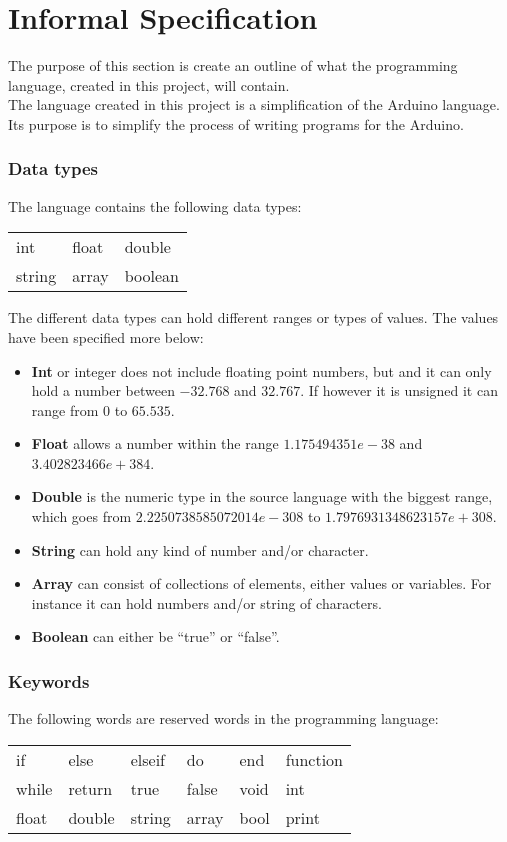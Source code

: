 \chapter{Informal Specification}\label{analysis:informal-specification}
The purpose of this section is create an outline of what the programming language, created in this project, will contain.
\\The language created in this project is a simplification of the Arduino language. Its purpose is to simplify the process of writing programs for the Arduino.   

\subsection{Data types}
The language contains the following data types: \\ 
\begin{center}
\begin{tabular}{ l l l }
int & float & double \\
string & array & boolean \\
\end{tabular}
\end{center}
The different data types can hold different ranges or types of values. The values have been specified more below: 
\begin{itemize}
\item \textbf{Int} or integer does not include floating point numbers, but and it can only hold a number between $-32.768$ and $32.767$. If however it is unsigned it can range from $0$ to $65.535$.
\item \textbf{Float} allows a number within the range $1.175494351e-38$ and $3.402823466e+384$.
\item \textbf{Double} is the numeric type in the source language with the biggest range, which goes from $2.2250738585072014e-308$ to $1.7976931348623157e+308$.
\item \textbf{String} can hold any kind of number and/or character. 
\item \textbf{Array} can consist of collections of elements, either values or variables. For instance it can hold numbers and/or string of characters. 
\item \textbf{Boolean} can either be ``true'' or ``false''. 
\end{itemize}

\subsection{Keywords}
The following words are reserved words in the programming language:\\ 
\begin{center}
\begin{tabular}{ l l l l l l}
if & else & elseif & do & end & function \\
while & return & true & false & void & int \\
float & double & string & array & bool & print\\
\end{tabular}
\end{center}

